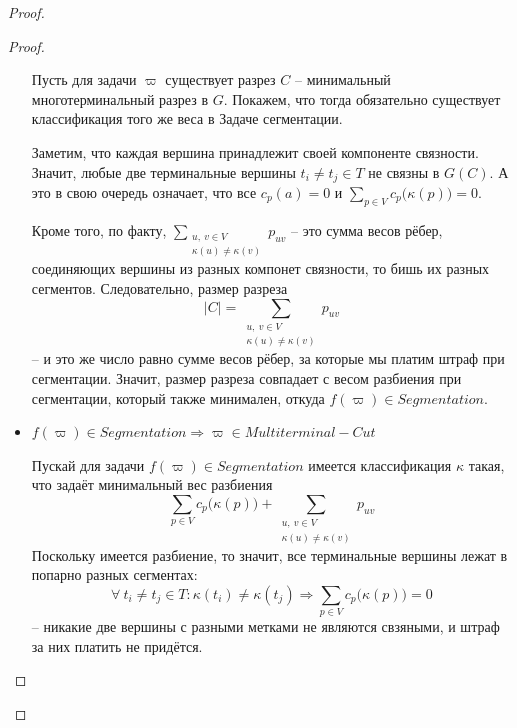 \documentclass[a4paper,12pt]{article}
\begin{document}
\begin{proof}
\begin{proof}
\begin{itemize}
            Пусть для задачи $\varpi$ существует разрез $C$ -- минимальный многотерминальный разрез в $G$. Покажем, что тогда обязательно существует классификация того же веса в Задаче сегментации.
            
            Заметим, что каждая вершина принадлежит своей компоненте связности. Значит, любые две терминальные вершины $t_i \neq t_j \in T$ не связны в $G(C)$. А это в свою очередь означает, что все $c_p(a) = 0$ и $\displaystyle \sum\limits_{p \in V}c_p\big(\kappa(p)\big) = 0$.
            
            Кроме того, по факту, $\displaystyle\sum\limits_{\substack{u,\ v \in V\\\kappa(u) \neq \kappa(v)}}p_{uv}$ -- это сумма весов рёбер, соединяющих вершины из разных компонет связности, то бишь их разных сегментов. Следовательно, размер разреза
            \[|C| = \displaystyle\sum\limits_{\substack{u,\ v \in V\\\kappa(u) \neq \kappa(v)}}p_{uv}\] -- и это же число равно сумме весов рёбер, за которые мы платим штраф при сегментации. Значит, размер разреза совпадает с весом разбиения при сегментации, который также минимален, откуда $f(\varpi) \in Segmentation$.
            
            \item $f(\varpi) \in Segmentation \Longrightarrow \varpi \in Multiterminal-Cut$
            
            Пускай для задачи $f(\varpi) \in Segmentation$ имеется классификация $\kappa$ такая, что задаёт минимальный вес разбиения \[\displaystyle \sum\limits_{p \in V}c_p\big(\kappa(p)\big) + \displaystyle\sum\limits_{\substack{u,\ v \in V\\\kappa(u) \neq \kappa(v)}}p_{uv}\] Поскольку имеется разбиение, то значит, все терминальные вершины лежат в попарно разных сегментах:
            \[\forall\ t_i \neq t_j \in T: \kappa(t_i) \neq \kappa(t_j)\Longrightarrow \displaystyle \sum\limits_{p \in V}c_p\big(\kappa(p)\big) = 0\] -- никакие две вершины с разными метками не являются свзяными, и штраф за них платить не придётся.
            

\end{itemize}
\end{proof}
\end{proof}
\end{document}
